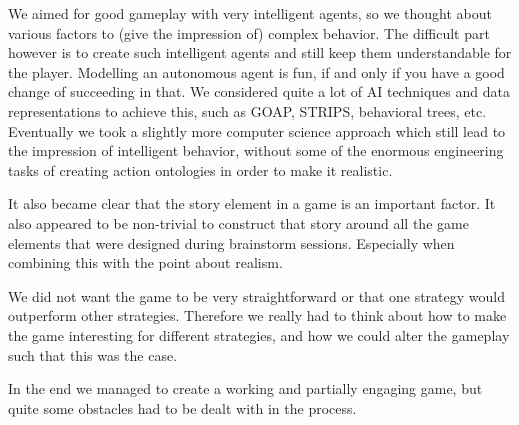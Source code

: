 \documentclass[11pt,a4paper]{article}
\begin{document}
We aimed for good gameplay with very intelligent agents, so we thought about various factors to (give the impression of) complex behavior. The difficult part however is to create such intelligent agents and still keep them understandable for the player. Modelling an autonomous agent is fun, if and only if you have a good change of succeeding in that. We considered quite a lot of AI techniques and data representations to achieve this, such as GOAP, STRIPS, behavioral trees, etc. Eventually we took a slightly more computer science approach which still lead to the impression of intelligent behavior, without some of the enormous engineering tasks of creating action ontologies in order to make it realistic.

It also became clear that the story element in a game is an important factor. It also appeared to be non-trivial to construct that story around all the game elements that were designed during brainstorm sessions. Especially when combining this with the point about realism.

We did not want the game to be very straightforward or that one strategy would outperform other strategies. Therefore we really had to think about how to make the game interesting for different strategies, and how we could alter the gameplay such that this was the case.

In the end we managed to create a working and partially engaging game, but quite some obstacles had to be dealt with in the process.
\end{document}
